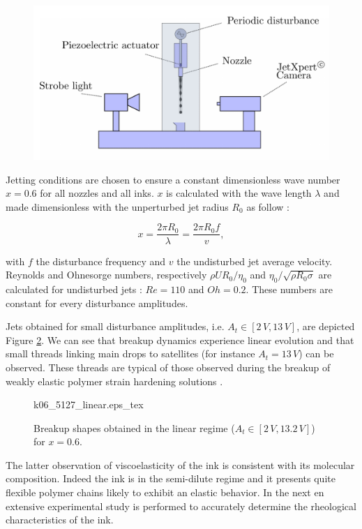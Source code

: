 \documentclass[twocolumn,10pt]{asme2ej}
\begin{document}
\begin{figure}[H]
    \centering
    \includegraphics[width=12cm]{device.png}
    \caption{}
    \label{device}
\end{figure}

Jetting conditions are chosen to ensure a constant dimensionless wave number $x=0.6$ for all nozzles and all inks. $x$ is calculated with the wave length $\lambda$ and made dimensionless with the unperturbed jet radius $R_0$ as follow :

\begin{equation}
  x=\frac{2 \pi R_0}{\lambda}=\frac{2 \pi R_0 f}{v},
\end{equation} 

with $f$ the disturbance frequency and $v$ the undisturbed jet average velocity. Reynolds and Ohnesorge numbers, respectively $\rho U R_0 / \eta_0$ and $\eta_0/\sqrt{\rho R_0 \sigma}$ are calculated for undisturbed jets : $Re=110$ and $Oh=0.2$. These numbers are constant for every disturbance amplitudes.

Jets obtained for small disturbance amplitudes, i.e. $A_t \in [2 \, V,13 \, V]$, are  depicted Figure \ref{BUlinear}. We can see that breakup dynamics experience linear evolution and that small threads linking main drops to satellites (for instance $A_t = 13 \, V$) can be observed. These threads are typical of those observed during the breakup of weakly elastic polymer strain hardening solutions \cite{christanti2002effect}.

\begin{figure}[H] 
    \def\svgwidth{7cm} 
    \vspace{2cm}
    \centering
     {k06_5127_linear.eps_tex}
     \caption{Breakup shapes obtained in the linear regime ($A_t \in [2 \, V,13.2 \, V]$) for $x=0.6$.}
      \label{BUlinear}
  \end{figure}
 
The latter observation of viscoelasticity of the ink is consistent with its molecular composition. Indeed the ink is in the semi-dilute regime and it presents quite flexible polymer chains likely to exhibit an elastic behavior. In the next en extensive experimental study is performed to accurately determine the rheological characteristics of the ink.
\end{document}
